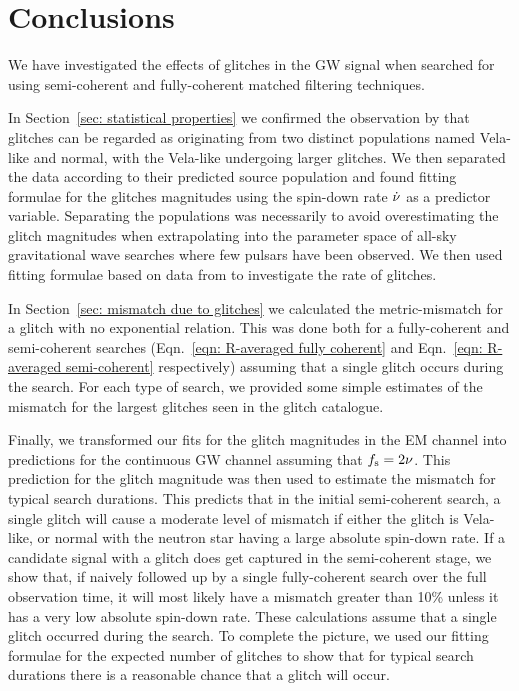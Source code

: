 \documentclass[../full_thesis/full_thesis.tex]{subfiles}
\begin{document}
\section{Conclusions}
\label{sec: conclusion}

We have investigated the effects of glitches in the GW signal when searched for
using semi-coherent and fully-coherent matched filtering techniques.

In Section~\ref{sec: statistical properties} we confirmed the observation by
\citet{Espinoza2011} that glitches can be regarded as originating from two
distinct populations named Vela-like and normal, with the Vela-like undergoing
larger glitches. We then separated the data according to their predicted source
population and found fitting formulae for the glitches magnitudes using the
spin-down rate $\dot{\nu}$ as a predictor variable. Separating the populations
was necessarily to avoid overestimating the glitch magnitudes when
extrapolating into the parameter space of all-sky gravitational wave searches where few pulsars
have been observed. We then used fitting formulae based on data from
\citet{Espinoza2011} to investigate the rate of glitches.

In Section~\ref{sec: mismatch due to glitches} we calculated the metric-mismatch for a
glitch with no exponential relation. This was done both for a
fully-coherent and semi-coherent searches (Eqn.~\eqref{eqn: R-averaged fully
coherent} and Eqn.~\eqref{eqn: R-averaged semi-coherent} respectively) assuming
that a single glitch occurs during the search. For each type of search, we provided
some simple estimates of the mismatch for the largest glitches seen in the
glitch catalogue.

Finally, we transformed our fits for the glitch magnitudes in the EM channel
into predictions for the continuous GW channel assuming that $f_{\textrm{s}}=2\nu$. This
prediction for the glitch magnitude was then used to estimate the mismatch for
typical search durations. This predicts that in the initial semi-coherent
search, a single glitch will cause a moderate level of mismatch if either the glitch
is Vela-like, or normal with the neutron star having a large absolute spin-down
rate. If a candidate signal with a glitch does get captured in the
semi-coherent stage, we show that, if naively followed up by a single
fully-coherent search over the full observation time, it will most likely have
a mismatch greater than 10\% unless it has a very low absolute spin-down rate.
These calculations assume that a single glitch occurred during the search. To
complete the picture, we used our fitting formulae for the expected number of
glitches to show that for typical search durations there is a reasonable chance
that a glitch will occur.
\end{document}
